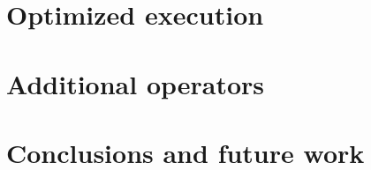 \documentclass[a4paper]{article}
\begin{document}
\section{Optimized execution}
\label{sec:optimized_execution}
 

\section{Additional operators}
\label{sec:additional_operators}
% 

\section{Conclusions and future work}
\label{sec:conclusions}
% 


 
\cite{*}
\nocite{}
\end{document}
